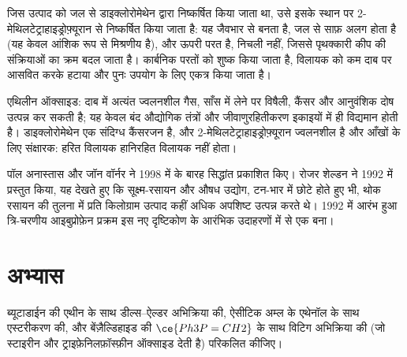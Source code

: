 \begin{inthelab}[उपचार-पश्चात् प्रक्रिया में डाइक्लोरोमेथेन का प्रतिस्थापन]
जिस उत्पाद को जल से डाइक्लोरोमेथेन द्वारा निष्कर्षित किया जाता था, उसे इसके स्थान पर
2-मेथिलटेट्राहाइड्रोफ़्यूरान से निष्कर्षित किया जाता है: यह जैवभार से बनता है, जल से
साफ़ अलग होता है (यह केवल आंशिक रूप से मिश्रणीय है), और ऊपरी परत है,
निचली नहीं, जिससे पृथक्कारी कीप की संक्रियाओं का क्रम बदल जाता है। कार्बनिक
परतों को शुष्क किया जाता है, विलायक को कम दाब पर आसवित करके हटाया और
पुनः उपयोग के लिए एकत्र किया जाता है।
\end{inthelab}

\begin{safety}{}
एथिलीन ऑक्साइड: दाब में अत्यंत ज्वलनशील गैस, साँस में लेने पर विषैली, कैंसर
और आनुवंशिक दोष उत्पन्न कर सकती है; यह केवल बंद औद्योगिक तंत्रों
और जीवाणुरहितीकरण इकाइयों में ही विद्यमान होती है। डाइक्लोरोमेथेन एक संदिग्ध कैंसरजन है, और
2-मेथिलटेट्राहाइड्रोफ़्यूरान ज्वलनशील है और आँखों के लिए संक्षारक: हरित विलायक
हानिरहित विलायक नहीं होता।
\end{safety}

\begin{history}[बारह सिद्धांत और एक संख्या]
पॉल अनास्तास और जॉन वॉर्नर ने 1998 में  के बारह सिद्धांत
प्रकाशित किए। रोजर शेल्डन ने 1992 में  प्रस्तुत किया, यह देखते हुए कि
सूक्ष्म-रसायन और औषध उद्योग, टन-भार में छोटे होते हुए भी,
थोक रसायन की तुलना में प्रति किलोग्राम उत्पाद कहीं अधिक अपशिष्ट उत्पन्न करते थे। 1992 में
आरंभ हुआ त्रि-चरणीय आइबुप्रोफ़ेन प्रक्रम इस नए दृष्टिकोण के
आरंभिक उदाहरणों में से एक बना।
\end{history}

\section{अभ्यास}

\begin{exercise}[$\star$]\label{exo:b3:green-industrial:1}
ब्यूटाडाईन की एथीन के साथ डील्स--ऐल्डर अभिक्रिया की, ऐसीटिक अम्ल के एथेनॉल के साथ
एस्टरीकरण की, और बेंज़ैल्डिहाइड की $\ce{Ph3P=CH2}$ के साथ विटिग अभिक्रिया की (जो स्टाइरीन और
ट्राइफ़ेनिलफ़ॉस्फ़ीन ऑक्साइड देती है)  परिकलित कीजिए।
\end{exercise}

